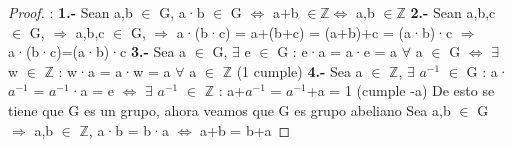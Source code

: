 \documentclass[10pt,a4paper,oneside]{article}
\begin{document}
				\begin{proof}:
					\newline
					\newline
					\textbf{1.-} Sean a,b $\in$ G, a·b $\in$ G $\iff$ a+b $\in \mathbb{Z} \iff$ a,b $\in \mathbb{Z}$
					\newline
					\newline
					\textbf{2.-} Sean a,b,c $\in$ G, $\Rightarrow$ a,b,c $\in$ G, $\Rightarrow$ a·(b·c) = a+(b+c) = (a+b)+c = (a·b)·c  $\Rightarrow$ a·(b·c)=(a·b)·c
					\newline
					\newline
					\textbf{3.-} Sea a $\in$ G, $\exists$ e $\in$ G : e·a = a·e = a $\forall$ a $\in$ G $\iff$  $\exists$ w $\in$ $\mathbb{Z}$ : w·a = a·w = a $\forall$ a $\in$ $\mathbb{Z}$ (1 cumple)
					\newline
					\newline
					\textbf{4.-} Sea a $\in$ $\mathbb{Z}$, $\exists$ $a^{-1}$ $\in$ G : a·$a^{-1}$ = $a^{-1}$·a = e $\iff$ $\exists$ $a^{-1}$ $\in$ $\mathbb{Z}$ : a+$a^{-1}$ = $a^{-1}$+a = 1 (cumple -a)
					\newline
					\newline
					De esto se tiene que G es un grupo, ahora veamos que G es grupo abeliano
					\newline
					\newline
					Sea a,b $\in$ G $\Rightarrow$ a,b $\in$ $\mathbb{Z}$, a·b = b·a $\iff$ a+b = b+a
				\end{proof}
\end{document}
